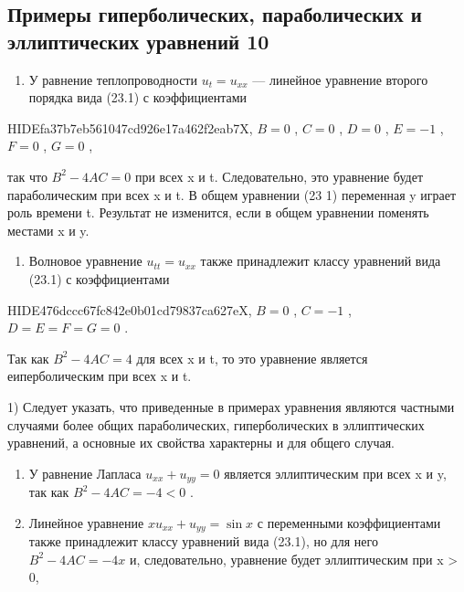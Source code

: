 \documentclass[
  ukrainian,
]{article}
\providecommand{\tightlist}{%
  \setlength{\itemsep}{0pt}\setlength{\parskip}{0pt}}
\begin{document}
\subsection{Примеры гиперболических, параболических и эллиптических
уравнений
10}\label{ux43fux440ux438ux43cux435ux440ux44b-ux433ux438ux43fux435ux440ux431ux43eux43bux438ux447ux435ux441ux43aux438ux445-ux43fux430ux440ux430ux431ux43eux43bux438ux447ux435ux441ux43aux438ux445-ux438-ux44dux43bux43bux438ux43fux442ux438ux447ux435ux441ux43aux438ux445-ux443ux440ux430ux432ux43dux435ux43dux438ux439-10}

\begin{enumerate}
\def\labelenumi{\arabic{enumi}.}
\tightlist
\item
  У равнение теплопроводности \(u_t = u_{xx}\) --- линейное уравнение
  второго порядка вида (23.1) с коэффициентами
\end{enumerate}

HIDEfa37b7eb561047cd926e17a462f2eab7X, \(B=0\) , \(C=0\) , \(D=0\) ,
\(E=-1\) , \(F=0\) , \(G=0\) ,

так что \(B^2-4AC=0\) при всех x и t. Следовательно, это уравнение будет
параболическим при всех x и t. В общем уравнении (23 1) переменная y
играет роль времени t. Результат не изменится, если в общем уравнении
поменять местами x и y.

\begin{enumerate}
\def\labelenumi{\arabic{enumi}.}
\setcounter{enumi}{1}
\tightlist
\item
  Волновое уравнение \(u_{tt} = u_{xx}\) также принадлежит классу
  уравнений вида (23.1) с коэффициентами
\end{enumerate}

HIDE476dccc67fc842e0b01cd79837ca627eX, \(B=0\) , \(C=-1\) ,
\(D=E=F=G=0\) .

Так как \(B^2 - 4AC = 4\) для всех x и t, то это уравнение является
еиперболическим при всех x и t.

1) Следует указать, что приведенные в примерах уравнения являются
частными случаями более общих параболических, гиперболических в
эллиптических уравнений, а основные их свойства характерны и для общего
случая.

\begin{enumerate}
\def\labelenumi{\arabic{enumi}.}
\setcounter{enumi}{2}
\item
  У равнение Лапласа \(u_{xx} + u_{yy} = 0\) является эллиптическим при
  всех x и y, так как \(B^2 - 4AC = -4 < 0\) .
\item
  Линейное уравнение \(xu_{xx} + u_{yy} = \sin x\) с переменными
  коэффициентами также принадлежит классу уравнений вида (23.1), но для
  него \(B^2-4AC=-4x\) и, следовательно, уравнение будет эллиптическим
  при x \textgreater{} 0,
\end{enumerate}
\end{document}
